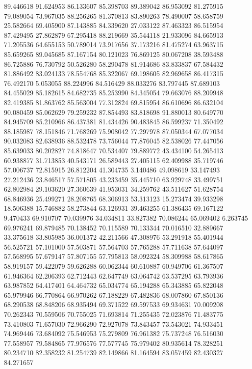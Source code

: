 89.446618
91.624953
86.133607
85.398703
89.389042
86.953092
81.275915
79.089054
73.967035
88.256265
81.370813
83.890263
78.490007
58.658759
25.582664
69.405900
87.143885
84.339620
27.033122
87.463323
86.515954
87.429495
27.862879
67.295418
88.219669
35.544118
21.933096
84.665913
71.205536
64.655153
50.789014
73.917656
37.173216
81.475274
63.963715
85.659265
89.045685
87.167154
80.121023
76.869125
80.067208
38.593488
86.725886
76.730792
50.526280
58.290478
81.914686
83.833837
67.584432
81.886492
83.024133
78.554768
85.322067
69.198605
82.969658
86.417315
76.492170
5.053055
88.224996
84.516429
88.033276
83.797445
87.689103
84.455029
85.182615
84.682735
85.253990
84.345054
79.663076
88.209948
82.419385
81.863762
85.563004
77.312824
69.815954
86.610696
86.632104
90.080459
85.062629
79.259232
87.854493
83.818698
91.880013
80.649770
84.945709
85.210966
86.437381
81.434426
90.483845
86.599237
71.350492
88.185987
78.151846
71.768269
75.908042
77.297978
87.050344
67.077034
90.032083
82.638936
88.532478
73.756044
77.876045
82.538026
77.447056
85.639033
80.202827
74.818647
70.534407
79.889772
43.434100
54.265413
60.938877
31.713853
40.543171
26.589443
27.405115
62.409988
35.719746
57.006737
72.815915
26.812204
41.304735
3.140486
49.098619
33.147493
27.212436
23.846517
57.571805
43.233459
35.445710
63.929748
33.499751
62.802984
29.103620
27.360639
41.953031
34.259762
43.511627
51.628754
68.846936
25.499271
28.208765
68.306913
53.313123
15.273474
39.933298
18.506388
15.746882
58.273844
63.126931
39.463255
61.386435
69.167122
9.470433
69.910707
70.039976
34.034811
33.827382
70.086244
65.069402
6.263745
69.976241
69.879485
70.138452
70.115589
70.133344
70.016510
32.889667
33.375618
33.805985
36.001372
42.211566
47.308976
53.291918
55.401944
56.525721
57.101000
57.503871
57.564703
57.765288
57.711638
57.644097
57.568995
57.679147
57.807155
57.795813
58.092324
58.309988
58.617865
58.919157
59.422079
59.626288
60.062344
60.610887
60.949706
61.367507
61.946364
62.206393
62.712443
62.647749
63.064742
63.537295
63.793936
63.987852
64.417401
64.464732
65.034774
65.194288
65.343885
65.822048
65.979946
66.770864
66.970262
67.188229
67.482836
68.007860
67.850136
68.290538
68.848206
68.935494
69.371522
69.597533
69.934631
70.009208
70.262343
70.559506
70.755025
71.693814
71.255435
72.023876
71.483775
73.410803
71.657030
72.966290
72.927078
73.843457
73.543021
74.933451
74.969446
73.684092
75.546953
75.279809
76.961382
75.737248
76.516030
77.558957
79.584865
77.976576
77.577745
75.979402
80.935614
78.328251
80.234710
82.358232
81.254739
82.149866
81.164594
83.057459
82.430327
84.271657
